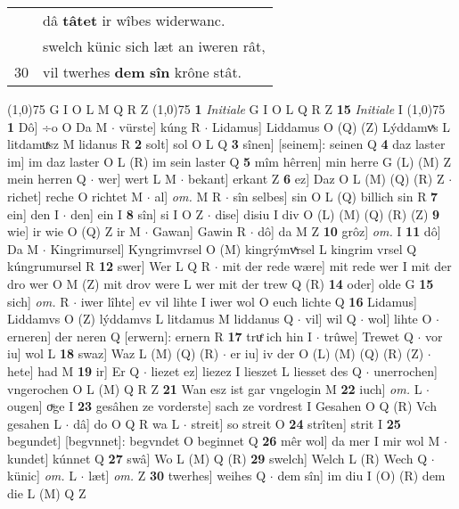 \documentclass[8pt,a4paper,notitlepage]{article}
\begin{document}
\begin{table}[ht]
\begin{minipage}[t]{0.5\linewidth}
\begin{tabular}{rl}
 & dâ \textbf{tâtet} ir wîbes widerwanc.\\ 
 & swelch künic sich læt an iweren rât,\\ 
30 & vil twerhes \textbf{dem} \textbf{sîn} krône stât.\\ 
\end{tabular}
\scriptsize
\line(1,0){75} \newline
G I O L M Q R Z \newline
\line(1,0){75} \newline
\textbf{1} \textit{Initiale} G I O L Q R Z  \textbf{15} \textit{Initiale} I  \newline
\line(1,0){75} \newline
\textbf{1} Dô] ÷o O Da M  $\cdot$ vürste] kúng R  $\cdot$ Lidamus] Liddamus O (Q) (Z) Lýddamvͯs L litdamuͯsz M lidanus R \textbf{2} solt] sol O L Q \textbf{3} sînen] [seinem]: seinen Q \textbf{4} daz laster im] im daz laster O L (R) im sein laster Q \textbf{5} mîm hêrren] min herre G (L) (M) Z mein herren Q  $\cdot$ wer] wert L M  $\cdot$ bekant] erkant Z \textbf{6} ez] Daz O L (M) (Q) (R) Z  $\cdot$ richet] reche O richtet M  $\cdot$ al] \textit{om.} M R  $\cdot$ sîn selbes] sin O L (Q) billich sin R \textbf{7} ein] den I  $\cdot$ den] ein I \textbf{8} sîn] si I O Z  $\cdot$ dise] disiu I div O (L) (M) (Q) (R) (Z) \textbf{9} wie] ir wie O (Q) Z ir M  $\cdot$ Gawan] Gawin R  $\cdot$ dô] da M Z \textbf{10} grôz] \textit{om.} I \textbf{11} dô] Da M  $\cdot$ Kingrimursel] Kyngrimvrsel O (M) kingrýmvͯrsel L kingrim vrsel Q kúngrumursel R \textbf{12} swer] Wer L Q R  $\cdot$ mit der rede wære] mit rede wer I mit der dro wer O M (Z) mit drov were L wer mit der trew Q (R) \textbf{14} oder] olde G \textbf{15} sich] \textit{om.} R  $\cdot$ iwer lîhte] ev vil lihte I iwer wol O euch lichte Q \textbf{16} Lidamus] Liddamvs O (Z) lýddamvs L litdamus M liddanus Q  $\cdot$ vil] wil Q  $\cdot$ wol] lihte O  $\cdot$ erneren] der neren Q [erwern]: ernern R \textbf{17} truͤ ich hin I  $\cdot$ trûwe] Trewet Q  $\cdot$ vor iu] wol L \textbf{18} swaz] Waz L (M) (Q) (R)  $\cdot$ er iu] iv der O (L) (M) (Q) (R) (Z)  $\cdot$ hete] had M \textbf{19} ir] Er Q  $\cdot$ liezet ez] liezez I lieszet L liesset des Q  $\cdot$ unerrochen] vngerochen O L (M) Q R Z \textbf{21} Wan esz ist gar vngelogin M \textbf{22} iuch] \textit{om.} L  $\cdot$ ougen] oͮge I \textbf{23} gesâhen ze vorderste] sach ze vordrest I Gesahen O Q (R) Vch gesahen L  $\cdot$ dâ] do O Q R wa L  $\cdot$ streit] so streit O \textbf{24} strîten] strit I \textbf{25} begundet] [begvnnet]: begvndet O beginnet Q \textbf{26} mêr wol] da mer I mir wol M  $\cdot$ kundet] kúnnet Q \textbf{27} swâ] Wo L (M) Q (R) \textbf{29} swelch] Welch L (R) Wech Q  $\cdot$ künic] \textit{om.} L  $\cdot$ læt] \textit{om.} Z \textbf{30} twerhes] weihes Q  $\cdot$ dem sîn] im diu I (O) (R) dem die L (M) Q Z \newline

\end{minipage}
\end{table}
\end{document}
